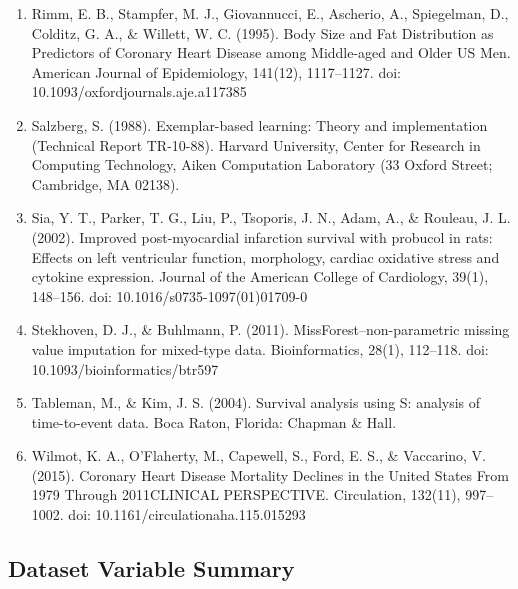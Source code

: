 \documentclass[
]{article}
\begin{document}
\begin{enumerate}
\item
  Rimm, E. B., Stampfer, M. J., Giovannucci, E., Ascherio, A.,
  Spiegelman, D., Colditz, G. A., \& Willett, W. C. (1995). Body Size
  and Fat Distribution as Predictors of Coronary Heart Disease among
  Middle-aged and Older US Men. American Journal of Epidemiology,
  141(12), 1117--1127. doi: 10.1093/oxfordjournals.aje.a117385
\item
  Salzberg, S. (1988). Exemplar-based learning: Theory and
  implementation (Technical Report TR-10-88). Harvard University, Center
  for Research in Computing Technology, Aiken Computation Laboratory (33
  Oxford Street; Cambridge, MA 02138).
\item
  Sia, Y. T., Parker, T. G., Liu, P., Tsoporis, J. N., Adam, A., \&
  Rouleau, J. L. (2002). Improved post-myocardial infarction survival
  with probucol in rats: Effects on left ventricular function,
  morphology, cardiac oxidative stress and cytokine expression. Journal
  of the American College of Cardiology, 39(1), 148--156. doi:
  10.1016/s0735-1097(01)01709-0
\item
  Stekhoven, D. J., \& Buhlmann, P. (2011). MissForest--non-parametric
  missing value imputation for mixed-type data. Bioinformatics, 28(1),
  112--118. doi: 10.1093/bioinformatics/btr597
\item
  Tableman, M., \& Kim, J. S. (2004). Survival analysis using S:
  analysis of time-to-event data. Boca Raton, Florida: Chapman \& Hall.
\item
  Wilmot, K. A., O'Flaherty, M., Capewell, S., Ford, E. S., \&
  Vaccarino, V. (2015). Coronary Heart Disease Mortality Declines in the
  United States From 1979 Through 2011CLINICAL PERSPECTIVE. Circulation,
  132(11), 997--1002. doi: 10.1161/circulationaha.115.015293
\end{enumerate}

\newpage

\hypertarget{dataset-variable-summary}{%
\subsection{Dataset Variable Summary}\label{dataset-variable-summary}}
\end{document}
